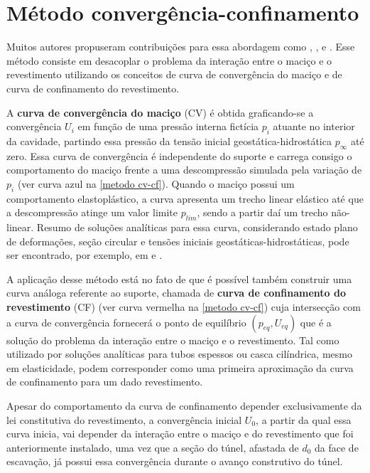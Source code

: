 \section{Método convergência-confinamento}
\label{cap:Método convergência-confinamento}
Muitos autores propuseram contribuições para essa abordagem como , ,  e . Esse método consiste em desacoplar o problema da interação entre o maciço e o revestimento utilizando os conceitos de curva de convergência do maciço e de curva de confinamento do revestimento. 

A \textbf{curva de convergência do maciço} (CV) é obtida graficando-se a convergência $U_i$ em função de uma pressão interna fictícia $p_i$ atuante no interior da cavidade, partindo essa pressão da tensão inicial geostática-hidrostática $p_\infty$ até zero. Essa curva de convergência é independente do suporte e carrega consigo o comportamento do maciço frente a uma descompressão simulada pela variação de $p_i$ (ver curva azul na \autoref{metodo cv-cf}). Quando o maciço possui um comportamento elastoplástico, a curva apresenta um trecho linear elástico até que a descompressão atinge um valor limite $p_{lim}$, sendo a partir daí um trecho não-linear. Resumo de soluções analíticas para essa curva, considerando estado plano de deformações, seção circular e tensões iniciais geostáticas-hidrostáticas, pode ser encontrado, por exemplo, em  e .

A aplicação desse método está no fato de que é possível também construir uma curva análoga referente ao suporte, chamada de \textbf{curva de confinamento do revestimento} (CF) (ver curva vermelha na \autoref{metodo cv-cf}) cuja intersecção com a curva de convergência fornecerá o ponto de equilíbrio $(p_{eq},U_{eq})$ que é a solução do problema da interação entre o maciço e o revestimento. Tal como utilizado por  soluções analíticas para tubos espessos ou casca cilíndrica, mesmo em elasticidade, podem corresponder como uma primeira aproximação da curva de confinamento para um dado revestimento.

Apesar do comportamento da curva de confinamento depender exclusivamente da lei constitutiva do revestimento, a convergência inicial $U_0$, a partir da qual essa curva inicia, vai depender da interação entre o maciço e do revestimento que foi anteriormente instalado, uma vez que a seção do túnel, afastada de $d_0$ da face de escavação, já possui essa convergência durante o avanço construtivo do túnel.

